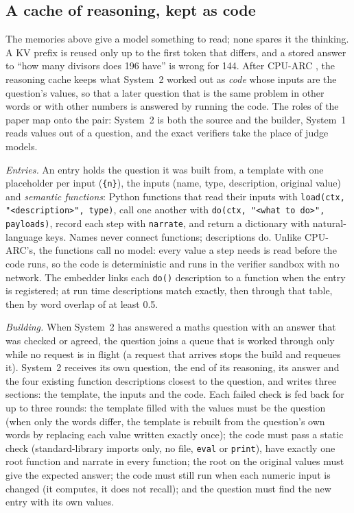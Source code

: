 \subsection{A cache of reasoning, kept as code}
\label{sec:mem:arc}
The memories above give a model something to read; none spares it the
thinking. A KV prefix is reused only up to the first token that differs, and
a stored answer to ``how many divisors does 196 have'' is wrong for 144. After
CPU-ARC \cite{belcak2026cpuarc}, the reasoning cache keeps what System~2
worked out as \emph{code} whose inputs are the question's values, so that a
later question that is the same problem in other words or with other numbers
is answered by running the code. The roles of the paper map onto the pair:
System~2 is both the source and the builder, System~1 reads values out of a
question, and the exact verifiers take the place of judge models.

\emph{Entries.} An entry holds the question it was built from, a template
with one placeholder per input (\texttt{\{n\}}), the inputs (name, type,
description, original value) and \emph{semantic functions}: Python functions
that read their inputs with \texttt{load(ctx, "<description>", type)}, call
one another with \texttt{do(ctx, "<what to do>", payloads)}, record each step
with \texttt{narrate}, and return a dictionary with natural-language keys.
Names never connect functions; descriptions do. Unlike CPU-ARC's, the
functions call no model: every value a step needs is read before the code
runs, so the code is deterministic and runs in the verifier sandbox with no
network. The embedder links each \texttt{do()} description to a function when
the entry is registered; at run time descriptions match exactly, then through
that table, then by word overlap of at least 0.5.

\emph{Building.} When System~2 has answered a maths question with an answer
that was checked or agreed, the question joins a queue that is worked through
only while no request is in flight (a request that arrives stops the build and
requeues it). System~2 receives its own question, the end of its reasoning,
its answer and the four existing function descriptions closest to the
question, and writes three sections: the template, the inputs and the code.
Each failed check is fed back for up to three rounds: the template filled
with the values must be the question (when only the words differ, the template
is rebuilt from the question's own words by replacing each value written
exactly once); the code must pass a static check (standard-library imports
only, no file, \texttt{eval} or \texttt{print}), have exactly one root
function and narrate in every function; the root on the original values must
give the expected answer; the code must still run when each numeric input is
changed (it computes, it does not recall); and the question must find the new
entry with its own values.

